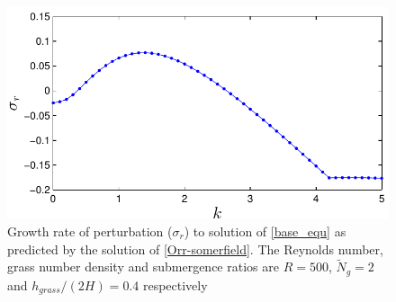 \documentclass[12pt]{report}   %
\newcommand{\Ndg}{\tilde{N}_g}
\begin{document}
\begin{figure}
 \centerline{\includegraphics{GrowthrateVsK}}
 \caption{Growth rate of perturbation ($\sigma_r$) to solution of \eqref{base_equ} as predicted by the solution of \eqref{Orr-somerfield}. The  Reynolds number, grass number density and submergence ratios are $R=500$, $\Ndg=2$ and $h_{grass}/(2H) = 0.4$ respectively }
\end{figure}
\end{document}
